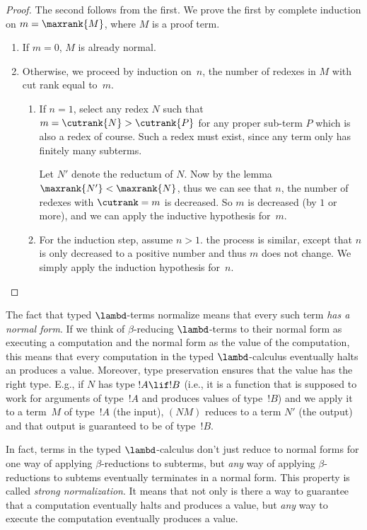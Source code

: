 \documentclass[../../../include/open-logic-section]{subfiles}
\begin{document}
\begin{proof}
  The second follows from the first. We prove the first by complete
  induction on $m=\maxrank{M}$, where $M$ is a proof term.
  \begin{enumerate}

  \item If $m=0$, $M$ is already normal.
  \item
    Otherwise, we proceed by induction on~$n$, the number of
    redexes in $M$ with cut rank equal to~$m$.
    \begin{enumerate}
    \item If $n=1$, select any redex $N$ such that $m = \cutrank{N} >
      \cutrank{P}$ for any proper sub-term $P$ which is also a redex
      of course. Such a redex must exist, since any term only has
      finitely many subterms.

      Let $N'$ denote the reductum of $N$. Now by the lemma
      $\maxrank{N'} < \maxrank{N}$, thus we can see that $n$, the
      number of redexes with $\cutrank=m$ is decreased. So $m$ is
      decreased (by $1$ or more), and we can apply the inductive
      hypothesis for~$m$.
    \item For the induction step, assume $n>1$. the process is
      similar, except that $n$ is only decreased to a positive number
      and thus $m$ does not change. We simply apply the induction
      hypothesis for~$n$.
    \end{enumerate}
\end{enumerate}
\end{proof}

The fact that typed $\lambd$-terms normalize means that every such
term \emph{has a normal form}. If we think of $\beta$-reducing
$\lambd$-terms to their normal form as executing a computation and the
normal form as the value of the computation, this means that every
computation in the typed $\lambd$-calculus eventually halts an
produces a value. Moreover, type preservation ensures that the value
has the right type. E.g., if $N$ has type $!A \lif !B$ (i.e., it is a
function that is supposed to work for arguments of type~$!A$ and
produces values of type~$!B$) and we apply it to a term~$M$ of type~$!A$
(the input), $(NM)$ reduces to a term $N'$ (the output) and that
output is guaranteed to be of type~$!B$.

In fact, terms in the typed $\lambd$-calculus don't just reduce to
normal forms for one way of applying $\beta$-reductions to subterms,
but \emph{any} way of applying $\beta$-reductions to subtems
eventually terminates in a normal form. This property is called
\emph{strong normalization}. It means that not only is there a way to
guarantee that a computation eventually halts and produces a value,
but \emph{any} way to execute the computation eventually produces a
value.
\end{document}
